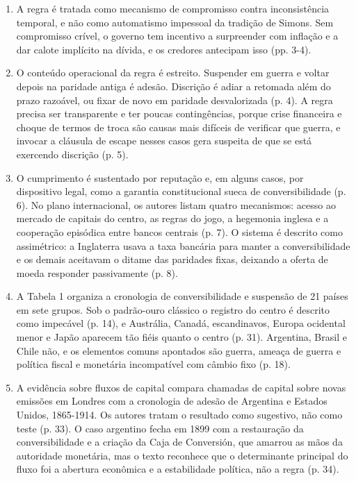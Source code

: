 \begin{enumerate}[leftmargin=*,nosep]
\item A regra é tratada como mecanismo de compromisso contra inconsistência
temporal, e não como automatismo impessoal da tradição de Simons. Sem
compromisso crível, o governo tem incentivo a surpreender com inflação e a dar
calote implícito na dívida, e os credores antecipam isso (pp. 3-4).
\item O conteúdo operacional da regra é estreito. Suspender em guerra e voltar
depois na paridade antiga é adesão. Discrição é adiar a retomada além do prazo
razoável, ou fixar de novo em paridade desvalorizada (p. 4). A regra precisa
ser transparente e ter poucas contingências, porque crise financeira e choque
de termos de troca são causas mais difíceis de verificar que guerra, e invocar
a cláusula de escape nesses casos gera suspeita de que se está exercendo
discrição (p. 5).
\item O cumprimento é sustentado por reputação e, em alguns casos, por
dispositivo legal, como a garantia constitucional sueca de conversibilidade
(p. 6). No plano internacional, os autores listam quatro mecanismos: acesso ao
mercado de capitais do centro, as regras do jogo, a hegemonia inglesa e a
cooperação episódica entre bancos centrais (p. 7). O sistema é descrito como
assimétrico: a Inglaterra usava a taxa bancária para manter a conversibilidade
e os demais aceitavam o ditame das paridades fixas, deixando a oferta de moeda
responder passivamente (p. 8).
\item A Tabela 1 organiza a cronologia de conversibilidade e suspensão de 21
países em sete grupos. Sob o padrão-ouro clássico o registro do centro é
descrito como impecável (p. 14), e Austrália, Canadá, escandinavos, Europa
ocidental menor e Japão aparecem tão fiéis quanto o centro (p. 31). Argentina, Brasil e
Chile não, e os elementos comuns apontados são guerra, ameaça de guerra e
política fiscal e monetária incompatível com câmbio fixo (p. 18).
\item A evidência sobre fluxos de capital compara chamadas de capital sobre
novas emissões em Londres com a cronologia de adesão de Argentina e Estados
Unidos, 1865-1914. Os autores tratam o resultado como sugestivo, não como teste
(p. 33). O caso argentino fecha em 1899 com a restauração da conversibilidade e
a criação da Caja de Conversión, que amarrou as mãos da autoridade monetária,
mas o texto reconhece que o determinante principal do fluxo foi a abertura
econômica e a estabilidade política, não a regra (p. 34).

\end{enumerate}
